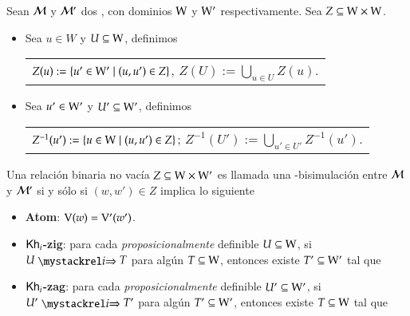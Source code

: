 \begin{definicion}\label{def:bisimulation}
    Sean $\mathcal{M}$ y $\mathcal{M}'$ dos \ultss, con dominios $\mathrm{W}$ y $\mathrm{W}'$ respectivamente. Sea $Z \subseteq \mathrm{W} \times \mathrm{W}$.
    \begin{itemize}
        \item Sea $u \in W$ y $U \subseteq \mathrm{W}$, definimos
        \begin{nscenter}
            \begin{tabular}{@{}c@{}}
                $Z(u) := \{ u' \in \mathrm{W}' \mid (u,u') \in Z \}$, \qquad $Z(U) := \bigcup_{u \in U} Z(u)$.
            \end{tabular}
        \end{nscenter}
        \item Sea $u' \in \mathrm{W}'$ y $U' \subseteq \mathrm{W}'$, definimos
        \begin{nscenter}
            \begin{tabular}{@{}c@{}}
                $Z^{-1}(u') := \{ u \in \mathrm{W} \mid (u,u') \in Z \}$; \qquad $Z^{-1}(U') := \bigcup_{u' \in U'} Z^{-1}(u')$.
            \end{tabular}
        \end{nscenter}
    \end{itemize}

    Una relación binaria no vacía $Z \subseteq \mathrm{W} \times \mathrm{W}'$ es llamada una \KHilogic-bisimulación entre $\mathcal{M}$ y 
    $\mathcal{M}'$ si y sólo si $(w,w') \in Z$ implica lo siguiente
    \begin{itemize}
        \item \textbf{Atom}: $\mathrm{V}(w)=\mathrm{V}'(w')$.

        \item \textbf{$\mathsf{Kh}_i$-zig}: para cada \emph{proposicionalmente} definible $U \subseteq \mathrm{W}$, si $U \ultsExecAgi T$ para algún $T \subseteq \mathrm{W}$, entonces existe $T' \subseteq \mathrm{W}'$ tal que
        \begin{multicols}{2}
        \end{multicols}
        
        \item \textbf{$\mathsf{Kh}_i$-zag}: para cada \emph{proposicionalmente} definible $U' \subseteq \mathrm{W}'$, si $U' \ultsExecAgi T'$ para algún $T' \subseteq \mathrm{W}'$, entonces existe $T \subseteq \mathrm{W}$ tal que
        \begin{multicols}{2}
        \end{multicols}


\end{itemize}
\end{definicion}
